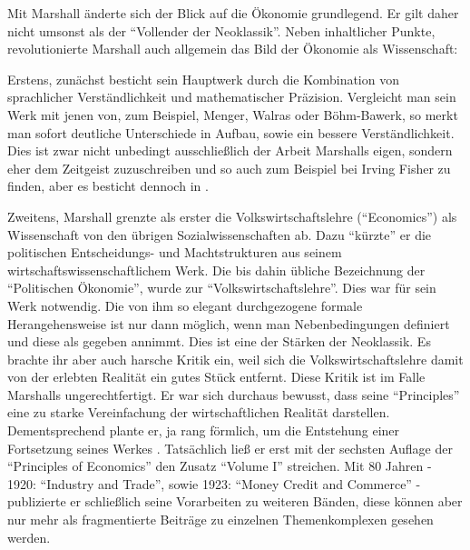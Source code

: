 Mit Marshall änderte sich der Blick auf die Ökonomie grundlegend. Er gilt daher nicht umsonst als der "`Vollender der Neoklassik"'. Neben inhaltlicher Punkte, revolutionierte Marshall auch allgemein das Bild der Ökonomie als Wissenschaft:

Erstens, zunächst besticht sein Hauptwerk durch die Kombination von sprachlicher Verständlichkeit und mathematischer Präzision. Vergleicht man sein Werk mit jenen von, zum Beispiel, Menger, Walras oder Böhm-Bawerk, so merkt man sofort deutliche Unterschiede in Aufbau, sowie ein bessere Verständlichkeit. Dies ist zwar nicht unbedingt ausschließlich der Arbeit Marshalls eigen, sondern eher dem Zeitgeist zuzuschreiben und so auch zum Beispiel bei Irving Fisher zu finden, aber es besticht dennoch in \textcite{Marshall1890}. 

Zweitens, Marshall grenzte als erster die Volkswirtschaftslehre ("`Economics"') als Wissenschaft von den übrigen Sozialwissenschaften ab. Dazu "`kürzte"' er die politischen Entscheidungs- und Machtstrukturen aus seinem wirtschaftswissenschaftlichem Werk. Die bis dahin übliche Bezeichnung der "`Politischen Ökonomie"', wurde zur "`Volkswirtschaftslehre"'. Dies war für sein Werk notwendig. Die von ihm so elegant durchgezogene formale Herangehensweise ist nur dann möglich, wenn man Nebenbedingungen definiert und diese als gegeben annimmt. Dies ist eine der Stärken der Neoklassik. Es brachte ihr aber auch harsche Kritik ein, weil sich die Volkswirtschaftslehre damit von der erlebten Realität ein gutes Stück entfernt. Diese Kritik ist im Falle Marshalls ungerechtfertigt. Er war sich durchaus bewusst, dass seine "`Principles"' eine zu starke Vereinfachung der wirtschaftlichen Realität darstellen. Dementsprechend plante er, ja rang förmlich, um die Entstehung einer Fortsetzung seines Werkes \parencite[S. 146]{Rieter1989}. Tatsächlich ließ er erst mit der sechsten Auflage der "`Principles of Economics"' den Zusatz "`Volume I"' streichen. Mit 80 Jahren - 1920: "`Industry and Trade"', sowie 1923: "`Money Credit and Commerce"' - publizierte er schließlich seine Vorarbeiten zu weiteren Bänden, diese können aber nur mehr als fragmentierte Beiträge zu einzelnen Themenkomplexen gesehen werden.

